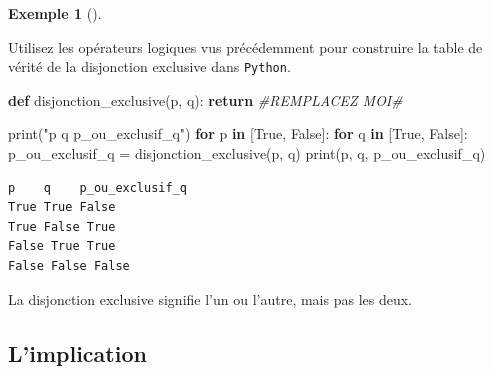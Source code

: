 \documentclass[
  letterpaper,
]{scrbook}
\newenvironment{Shaded}{}{}
\newcommand{\BuiltInTok}[1]{#1}
\newcommand{\CommentTok}[1]{\textcolor[rgb]{0.38,0.63,0.69}{\textit{#1}}}
\newcommand{\ControlFlowTok}[1]{\textcolor[rgb]{0.00,0.44,0.13}{\textbf{#1}}}
\newcommand{\KeywordTok}[1]{\textcolor[rgb]{0.00,0.44,0.13}{\textbf{#1}}}
\newcommand{\NormalTok}[1]{#1}
\newcommand{\OperatorTok}[1]{\textcolor[rgb]{0.40,0.40,0.40}{#1}}
\newcommand{\StringTok}[1]{\textcolor[rgb]{0.25,0.44,0.63}{#1}}
\newcommand{\VariableTok}[1]{\textcolor[rgb]{0.10,0.09,0.49}{#1}}
\theoremstyle{definition}
\newtheorem{example}{Exemple}[chapter]
\theoremstyle{definition}
\theoremstyle{plain}
\theoremstyle{remark}
\begin{document}
\leavevmode{}%
\begin{example}[]\label{exm-disjonction-exclusive-python}

Utilisez les opérateurs logiques vus précédemment pour construire la
table de vérité de la disjonction exclusive dans \texttt{Python}.

\hypertarget{disjonction-exclusive-python-todo}{}
\begin{Shaded}
\begin{Highlighting}[]
\KeywordTok{def}\NormalTok{ disjonction\_exclusive(p, q):}
    \ControlFlowTok{return} \CommentTok{\#REMPLACEZ MOI\#}

\BuiltInTok{print}\NormalTok{(}\StringTok{"p    q    p\_ou\_exclusif\_q"}\NormalTok{)}
\ControlFlowTok{for}\NormalTok{ p }\KeywordTok{in}\NormalTok{ [}\VariableTok{True}\NormalTok{, }\VariableTok{False}\NormalTok{]:}
    \ControlFlowTok{for}\NormalTok{ q }\KeywordTok{in}\NormalTok{ [}\VariableTok{True}\NormalTok{, }\VariableTok{False}\NormalTok{]:}
\NormalTok{        p\_ou\_exclusif\_q }\OperatorTok{=}\NormalTok{ disjonction\_exclusive(p, q)}
        \BuiltInTok{print}\NormalTok{(p, q, p\_ou\_exclusif\_q)}
\end{Highlighting}
\end{Shaded}

\hypertarget{disjonction-exclusive-python}{}
\begin{verbatim}
p    q    p_ou_exclusif_q
True True False
True False True
False True True
False False False
\end{verbatim}

\end{example}

\begin{tcolorbox}[enhanced jigsaw, colframe=quarto-callout-important-color-frame, bottomtitle=1mm, coltitle=black, breakable, arc=.35mm, title=\textcolor{quarto-callout-important-color}{\faExclamation}\hspace{0.5em}{Important}, opacitybacktitle=0.6, colback=white, opacityback=0, colbacktitle=quarto-callout-important-color!10!white, leftrule=.75mm, rightrule=.15mm, titlerule=0mm, toprule=.15mm, toptitle=1mm, left=2mm, bottomrule=.15mm]

La disjonction exclusive signifie l'un ou l'autre, mais pas les deux.

\end{tcolorbox}

\hypertarget{limplication}{%
\subsection{L'implication}\label{limplication}}
\end{document}

